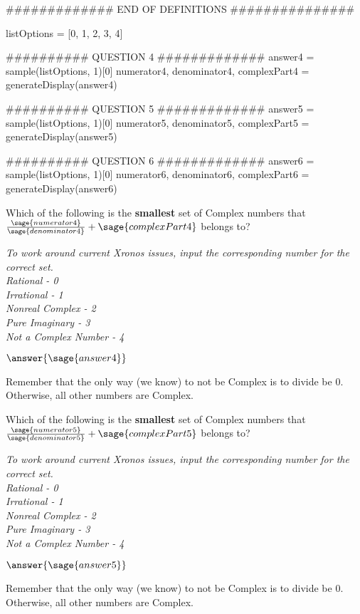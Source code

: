 \documentclass{ximera}
\begin{document}
\begin{sagesilent}
############# END OF DEFINITIONS ###############

listOptions = [0, 1, 2, 3, 4]

########## QUESTION 4 #############
answer4 = sample(listOptions, 1)[0]
numerator4, denominator4, complexPart4 = generateDisplay(answer4)

########## QUESTION 5 #############
answer5 = sample(listOptions, 1)[0]
numerator5, denominator5, complexPart5 = generateDisplay(answer5)

########## QUESTION 6 #############
answer6 = sample(listOptions, 1)[0]
numerator6, denominator6, complexPart6 = generateDisplay(answer6)
\end{sagesilent}

\begin{exercise}
Which of the following is the \textbf{smallest} set of Complex numbers that $\frac{\sage{numerator4}}{\sage{denominator4}} + \sage{complexPart4} $ belongs to?

\textit{To work around current Xronos issues, input the corresponding number for the correct set. \\
Rational - 0 \\
Irrational - 1 \\
Nonreal Complex - 2 \\
Pure Imaginary - 3 \\
Not a Complex Number - 4
}

$\answer{\sage{answer4}}$
\begin{hint}
Remember that the only way (we know) to not be Complex is to divide be 0. Otherwise, all other numbers are Complex.
\end{hint}
\end{exercise}

\begin{exercise}
Which of the following is the \textbf{smallest} set of Complex numbers that $\frac{\sage{numerator5}}{\sage{denominator5}} + \sage{complexPart5} $ belongs to?

\textit{To work around current Xronos issues, input the corresponding number for the correct set. \\
Rational - 0 \\
Irrational - 1 \\
Nonreal Complex - 2 \\
Pure Imaginary - 3 \\
Not a Complex Number - 4
}

$\answer{\sage{answer5}}$
\begin{hint}
Remember that the only way (we know) to not be Complex is to divide be 0. Otherwise, all other numbers are Complex.
\end{hint}
\end{exercise}
\end{document}
